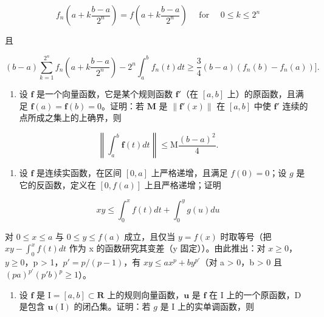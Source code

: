 \[
f _ {n} \left(a + k \frac {b - a}{2 ^ {n}}\right) = f \left(a + k \frac {b - a}{2 ^ {n}}\right) \quad \text { for } \quad 0 \leqslant k \leqslant 2 ^ {n}
\]

且

\[
(b - a) \sum_ {k = 1} ^ {2 ^ {n}} f _ {n} \left(a + k \frac {b - a}{2 ^ {n}}\right) - 2 ^ {n} \int_ {a} ^ {b} f _ {n} (t) d t \geqslant \frac {3}{4} (b - a) \left(f _ {n} (b) - f _ {n} (a)\right) \Biggr ].
\]

\begin{enumerate}
\def\labelenumi{\arabic{enumi})}
\setcounter{enumi}{13}
\tightlist
\item
  设 \(\mathbf{f}\) 是一个向量函数，它是某个规则函数 \(\mathbf{f}'\)（在 \([a, b]\) 上）的原函数，且满足 \(\mathbf{f}(a) = \mathbf{f}(b) = 0\)。证明：若 \(\mathbf{M}\) 是 \(\| \mathbf{f}'(x)\|\) 在 \([a, b]\) 中使 \(\mathbf{f}'\) 连续的点所成之集上的上确界，则
\end{enumerate}

\[
\left\| \int_ {a} ^ {b} \mathbf {f} (t) d t \right\| \leqslant \mathrm{M} \frac {(b - a) ^ {2}}{4}.
\]

\begin{enumerate}
\def\labelenumi{\arabic{enumi})}
\setcounter{enumi}{14}
\tightlist
\item
  设 \(\mathbf{f}\) 是连续实函数，在区间 \([0, a]\) 上严格递增，且满足 \(f(0) = 0\)；设 \(g\) 是它的反函数，定义在 \([0, f(a)]\) 上且严格递增；证明
\end{enumerate}

\[
x y \leqslant \int_ {0} ^ {x} f (t) d t + \int_ {0} ^ {y} g (u) d u
\]

对 \(0 \leqslant x \leqslant a\) 与 \(0 \leqslant y \leqslant f(a)\) 成立，且仅当 \(y = f(x)\) 时取等号（把 \(xy - \int_{0}^{x} f(t) dt\) 作为 x 的函数研究其变差（y 固定））。由此推出：对 \(x \geqslant 0\)，\(y \geqslant 0\)，p \textgreater{} 1，\(p' = p/(p - 1)\)，有 \(xy \leqslant ax^{p} + by^{p'}\)（对 a \textgreater{} 0，b \textgreater{} 0 且 \((pa)^{p'}(p'b)^{p} \geqslant 1\)）。

\begin{enumerate}
\def\labelenumi{\arabic{enumi})}
\setcounter{enumi}{15}
\tightlist
\item
  设 \(\mathbf{f}\) 是 \(\mathrm{I} = [a, b] \subset \mathbf{R}\) 上的规则向量函数，\(\mathbf{u}\) 是 \(\mathbf{f}\) 在 \(\mathrm{I}\) 上的一个原函数，\(\mathrm{D}\) 是包含 \(\mathbf{u}(\mathrm{I})\) 的闭凸集。证明：若 \(g\) 是 \(\mathrm{I}\) 上的实单调函数，则
\end{enumerate}

